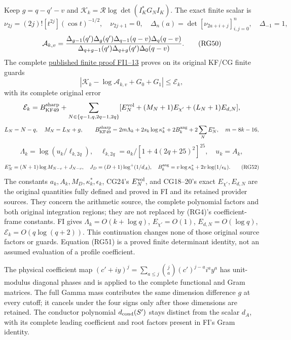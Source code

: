 \documentclass[11pt]{article}
\begin{document}
Keep \(g=q-q'-v\) and \(\mathcal K_k=\mathcal R\log\det(I_K^*G_NI_K)\). The exact finite scalar is \[
\nu_{2j}=(2j)![t^{2j}](\cos t)^{-1/2},\quad\nu_{2j+1}=0,\quad
\Delta_n(a)=\det[\nu_{2a+i+j}]_{i,j=0}^n,\quad\Delta_{-1}=1,
\] \[
\mathcal A_{k,v}=
{\Delta_{g-1}(q')\Delta_g(q')\Delta_{q-1}(q-v)\Delta_q(q-v)
\over\Delta_{q+g-1}(q')\Delta_{q+g}(q')\Delta_0(q-v)}.
\tag{RG50}
\] The complete \href{https://github.com/KokunoYumeto/zeta-function-research-reader/blob/75256b0237884bdef0074c2ac6310de1ea32ec26/workbenches/splitzero-tandem/continuations/20260921-invariant-collision/FINITE_INVARIANT_PROOFS.md}{published finite proof FI1--13} proves on its original KF/CG finite guards \[
|\mathcal K_k-\log\mathcal A_{k,v}+G_0+G_1|\le\mathcal E_k,
\tag{RG51}
\] with its complete original error \[
\mathcal E_k=B_{\rm KF49}^{\rm sharp}
+\sum_{N\in\{q-1,q,2q-1,2q\}}
[E_N^{\rm vol}+(M_N+1)E_{\chi'}+(L_N+1)E_{d,N}],
\] \[
L_N=N-q,\quad M_N=L_N+g,\qquad
B_{\rm KF49}^{\rm sharp}=2m\Lambda_k+2s_k\log\kappa_k^*
+2B_k^{\rm ang}+2\sum_NE_N^*,\quad m=8k-16,
\] \[
\Lambda_k=\log(u_k/\ell_{k,2q}),\quad
\ell_{k,2q}=a_k/[1+4(2q+25)^2]^{25},\quad u_k=A_k,
\] \[
E_N^*=(N+1)\log M_{N-v}+J_{N-v},\quad
J_D=(D+1)\log^+(1/d_A),\quad
B_k^{\rm ang}=v\log\kappa_k^*+2v\log(1/\epsilon_k).
\tag{RG52}
\] The constants \(a_k,A_k,M_D,\kappa_k^*,\epsilon_k\), CG24's \(E_N^{\rm vol}\), and CG18--20's exact \(E_{\chi'},E_{d,N}\) are the original quantities fully defined and proved in FI and its retained provider sources. They concern the arithmetic source, the complete polynomial factors and both original integration regions; they are not replaced by (RG4)'s coefficient-frame constants. FI gives \(\Lambda_k=O(k+\log q)\), \(E_{\chi'}=O(1)\), \(E_{d,N}=O(\log q)\), \(\mathcal E_k=O(q\log(q+2))\). This continuation changes none of those original source factors or guards. Equation (RG51) is a proved finite determinant identity, not an assumed evaluation of a profile coefficient.

The physical coefficient map \((c'+iy)^j=\sum_{a\le j}\binom ja(c')^{j-a}i^ay^a\) has unit-modulus diagonal phases and is applied to the complete functional and Gram matrices. The full Gamma mass contributes the same dimension difference \(g\) at every cutoff; it cancels under the four signs only after those dimensions are retained. The conductor polynomial \(d_{\rm cond}(S')\) stays distinct from the scalar \(d_A\), with its complete leading coefficient and root factors present in FI's Gram identity.
\end{document}
